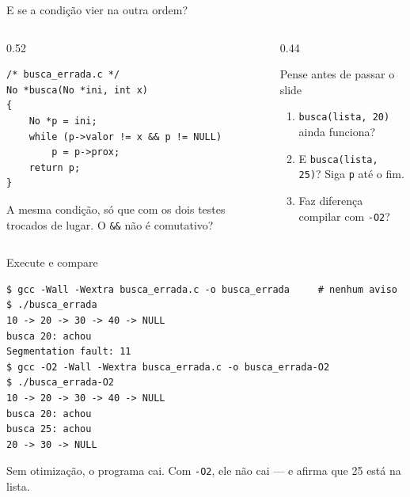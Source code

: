 \documentclass[aspectratio=169]{beamer}
\begin{document}
\begin{frame}[fragile]{E se a condição vier na outra ordem?}
  \begin{columns}[c]
    \begin{column}{0.52\textwidth}
\begin{lstlisting}[style=tinyC]
/* busca_errada.c */
No *busca(No *ini, int x)
{
    No *p = ini;
    while (p->valor != x && p != NULL)
        p = p->prox;
    return p;
}
\end{lstlisting}
      \small A mesma condição, só que com os dois testes trocados de lugar.
      O \texttt{\&\&} não é comutativo?
    \end{column}
    \begin{column}{0.44\textwidth}
      \begin{block}{Pense antes de passar o slide}
        \small
        \begin{enumerate}
          \item \texttt{busca(lista, 20)} ainda funciona?
          \item E \texttt{busca(lista, 25)}? Siga \texttt{p} até o fim.
          \item Faz diferença compilar com \texttt{-O2}?
        \end{enumerate}
      \end{block}
    \end{column}
  \end{columns}
\end{frame}

\begin{frame}[fragile]{Execute e compare}
  \vspace{-0.5em}
\begin{lstlisting}[style=shellStyle]
$ gcc -Wall -Wextra busca_errada.c -o busca_errada     # nenhum aviso
$ ./busca_errada
10 -> 20 -> 30 -> 40 -> NULL
busca 20: achou
Segmentation fault: 11
$ gcc -O2 -Wall -Wextra busca_errada.c -o busca_errada-O2
$ ./busca_errada-O2
10 -> 20 -> 30 -> 40 -> NULL
busca 20: achou
busca 25: achou
20 -> 30 -> NULL
\end{lstlisting}
  \vspace{-0.6em}
  \centering\scriptsize\textcolor{UFSGray}{Sem otimização, o programa cai. Com
  \texttt{-O2}, ele não cai --- e afirma que 25 está na lista.}
\end{frame}
\end{document}
